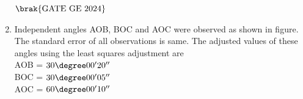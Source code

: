 \documentclass[journal,12pt,onecolumn]{IEEEtran}
\theoremstyle{remark}
\begin{document}
\begin{enumerate}
\begin{enumerate}
\end{enumerate}
\hfill $\brak{\text{GATE GE 2024}}$
\bigskip
\item Independent angles AOB, BOC and AOC were observed as shown in figure.
The standard error of all observations is same. The adjusted values of these angles using the least squares adjustment are\\
AOB = $30\degree00'20''$\\
BOC = $30\degree00'05''$\\
AOC = $60\degree00'10''$\\


\end{enumerate}
\end{document}
